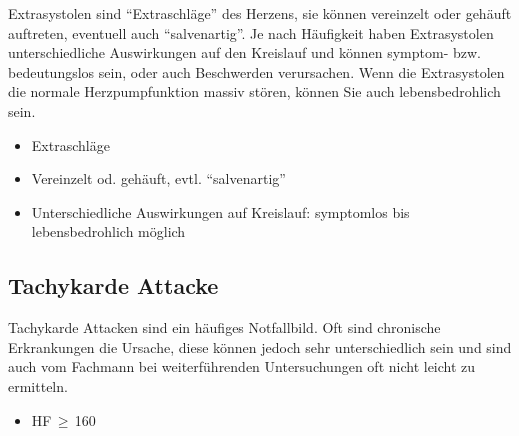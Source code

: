 

{%
\label{topic:extrasystolen}
Extrasystolen sind \enquote{Extraschläge} des Herzens, sie können
vereinzelt oder gehäuft auftreten, eventuell auch
\enquote{salvenartig}. Je nach Häufigkeit haben Extrasystolen
unterschiedliche Auswirkungen auf den Kreislauf und können
symptom- bzw. bedeutungslos sein, oder auch Beschwerden
verursachen. Wenn die Extrasystolen die normale
Herzpumpfunktion massiv stören, können Sie auch
lebensbedrohlich sein.
}
{%
\begin{itemize}
  \item Extraschläge
  \item Vereinzelt od. gehäuft, evtl. \enquote{salvenartig}
  \item Unterschiedliche Auswirkungen auf Kreislauf: symptomlos bis
  lebensbedrohlich möglich
\end{itemize}

}{}{}{}





\subsection{Tachykarde Attacke}
\label{topic:tachykarde-attacke}


{%
Tachykarde Attacken sind ein häufiges Notfallbild. Oft sind
chronische Erkrankungen die Ursache, diese
können jedoch sehr unterschiedlich sein und sind auch vom Fachmann bei weiterführenden Untersuchungen
oft nicht leicht zu ermitteln.
}{
\begin{itemize}
  \item HF\,$\geq$\,160\PerMin*
\end{itemize}
}{}{}{}


